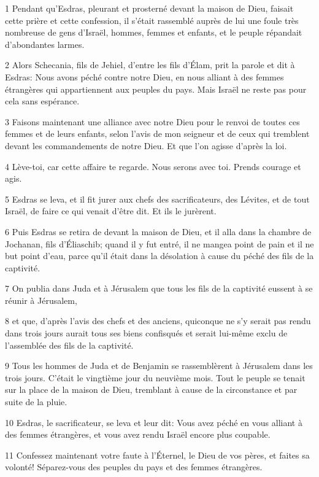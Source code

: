 \par 1 Pendant qu'Esdras, pleurant et prosterné devant la maison de Dieu, faisait cette prière et cette confession, il s'était rassemblé auprès de lui une foule très nombreuse de gens d'Israël, hommes, femmes et enfants, et le peuple répandait d'abondantes larmes.
\par 2 Alors Schecania, fils de Jehiel, d'entre les fils d'Élam, prit la parole et dit à Esdras: Nous avons péché contre notre Dieu, en nous alliant à des femmes étrangères qui appartiennent aux peuples du pays. Mais Israël ne reste pas pour cela sans espérance.
\par 3 Faisons maintenant une alliance avec notre Dieu pour le renvoi de toutes ces femmes et de leurs enfants, selon l'avis de mon seigneur et de ceux qui tremblent devant les commandements de notre Dieu. Et que l'on agisse d'après la loi.
\par 4 Lève-toi, car cette affaire te regarde. Nous serons avec toi. Prends courage et agis.
\par 5 Esdras se leva, et il fit jurer aux chefs des sacrificateurs, des Lévites, et de tout Israël, de faire ce qui venait d'être dit. Et ils le jurèrent.
\par 6 Puis Esdras se retira de devant la maison de Dieu, et il alla dans la chambre de Jochanan, fils d'Éliaschib; quand il y fut entré, il ne mangea point de pain et il ne but point d'eau, parce qu'il était dans la désolation à cause du péché des fils de la captivité.
\par 7 On publia dans Juda et à Jérusalem que tous les fils de la captivité eussent à se réunir à Jérusalem,
\par 8 et que, d'après l'avis des chefs et des anciens, quiconque ne s'y serait pas rendu dans trois jours aurait tous ses biens confisqués et serait lui-même exclu de l'assemblée des fils de la captivité.
\par 9 Tous les hommes de Juda et de Benjamin se rassemblèrent à Jérusalem dans les trois jours. C'était le vingtième jour du neuvième mois. Tout le peuple se tenait sur la place de la maison de Dieu, tremblant à cause de la circonstance et par suite de la pluie.
\par 10 Esdras, le sacrificateur, se leva et leur dit: Vous avez péché en vous alliant à des femmes étrangères, et vous avez rendu Israël encore plus coupable.
\par 11 Confessez maintenant votre faute à l'Éternel, le Dieu de vos pères, et faites sa volonté! Séparez-vous des peuples du pays et des femmes étrangères.
